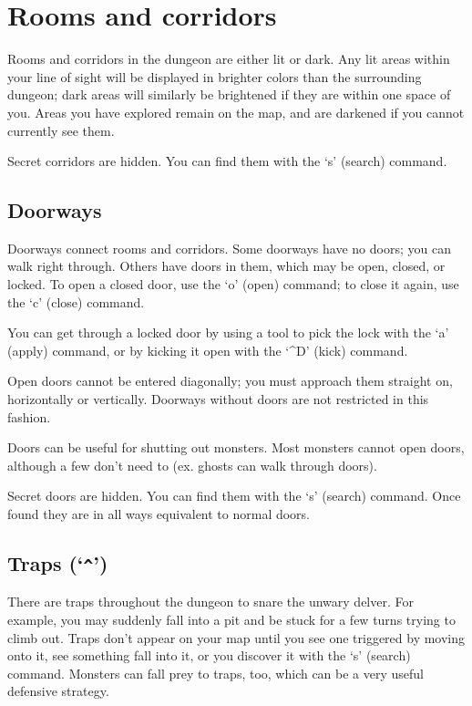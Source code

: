 \section{Rooms and corridors}

Rooms and corridors in the dungeon are either lit or dark.
Any lit areas within your line of sight will be displayed in
brighter colors than the surrounding dungeon; dark areas will
similarly be brightened if they are within one space of you.
Areas you have explored remain on the map, and are darkened
if you cannot currently see them.

Secret corridors are hidden.  You can find them with the `s' (search)
command.
\subsection*{Doorways}

Doorways connect rooms and corridors.  Some doorways have no doors;
you can walk right through.  Others have doors in them, which may be
open, closed, or locked.  To open a closed door, use the `o' (open)
command; to close it again, use the `c' (close) command.

You can get through a locked door by using a tool to pick the lock
with the `a' (apply) command, or by kicking it open with the `\^{}D'
(kick) command.

Open doors cannot be entered diagonally; you must approach them
straight on, horizontally or vertically.  Doorways without doors are
not restricted in this fashion.

Doors can be useful for shutting out monsters.  Most monsters cannot
open doors, although a few don't need to (ex. ghosts can walk through
doors).

Secret doors are hidden.  You can find them with the `s' (search)
command.  Once found they are in all ways equivalent to normal doors.
\subsection*{Traps (`{\tt \^{}}')}

There are traps throughout the dungeon to snare the unwary delver.
For example, you may suddenly fall into a pit and be stuck for a few
turns trying to climb out.  Traps don't appear on your map until you
see one triggered by moving onto it, see something fall into it, or you
discover it with the `s' (search) command.  Monsters can fall prey to
traps, too, which can be a very useful defensive strategy.

